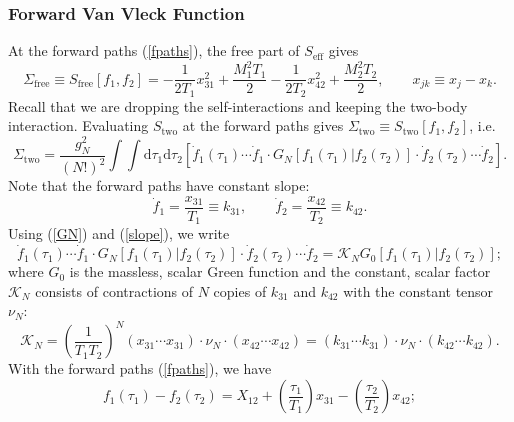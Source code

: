 \subsubsection{Forward Van Vleck Function}
At the forward paths (\ref{fpaths}), the free part of $S_{\text{eff}}$ gives
\begin{equation}
	\Sigma_{\text{free}} \equiv S_{\text{free}}[f_{1}, f_{2}] = - \frac{1}{2 T_{1}} x_{3 1}^{2} + \frac{M_{1}^{2} T_{1}}{2} - \frac{1}{2 T_{2}} x_{4 2}^{2} + \frac{M_{2}^{2} T_{2}}{2}, \qquad x_{jk} \equiv x_{j} - x_{k}.
	\label{SigFree}
\end{equation}
Recall that we are dropping the self-interactions and keeping the two-body interaction. Evaluating $S_{\text{two}}$ at the forward paths gives $\Sigma_{\text{two}} \equiv S_{\text{two}}[f_{1}, f_{2}]$, i.e. 
\begin{equation}
	\Sigma_{\text{two}} = \frac{g_{N}^{2}}{(N!)^{2}} \int \int \mathrm{d}\tau_{1} \mathrm{d}\tau_{2} \left[ \dot{f}_{1}(\tau_{1}) \cdots \dot{f}_{1} \cdot G_{N}[f_{1}(\tau_{1}) | f_{2}(\tau_{2})] \cdot \dot{f}_{2}(\tau_{2}) \cdots \dot{f}_{2} \right].
\end{equation}
Note that the forward paths have constant slope:
\begin{equation}
	\dot{f}_{1} = \frac{x_{31}}{T_{1}} \equiv k_{31}, \qquad \dot{f}_{2} = \frac{x_{42}}{T_{2}} \equiv k_{42}.
	\label{slope}
\end{equation}
Using (\ref{GN}) and (\ref{slope}), we write
\begin{equation}
	\dot{f}_{1}(\tau_{1}) \cdots \dot{f}_{1} \cdot G_{N}[f_{1}(\tau_{1}) | f_{2}(\tau_{2})] \cdot \dot{f}_{2}(\tau_{2}) \cdots \dot{f}_{2} = \mathcal{K}_{N} G_{0}[f_{1}(\tau_{1}) | f_{2}(\tau_{2})];
\end{equation}
where $G_{0}$ is the massless, scalar Green function and the constant, scalar factor $\mathcal{K}_{N}$ consists of contractions of $N$ copies of $k_{3 1}$ and $k_{4 2}$ with the constant tensor $\nu_{N}$:
\begin{equation}
	\mathcal{K}_{N} = \left( \frac{1}{T_{1} T_{2}} \right)^{N} \left(x_{3 1} \cdots x_{3 1} \right) \cdot \nu_{N} \cdot \left(x_{4 2} \cdots x_{4 2}\right) = \left(k_{3 1} \cdots k_{3 1} \right) \cdot \nu_{N} \cdot \left(k_{4 2} \cdots k_{4 2}\right).
\end{equation}
With the forward paths (\ref{fpaths}), we have
\begin{equation}
	f_{1}(\tau_{1}) - f_{2}(\tau_{2}) = X_{1 2} + \left( \frac{\tau_{1}}{T_{1}} \right) x_{3 1} - \left( \frac{\tau_{2}}{T_{2}} \right) x_{4 2};
\end{equation}

